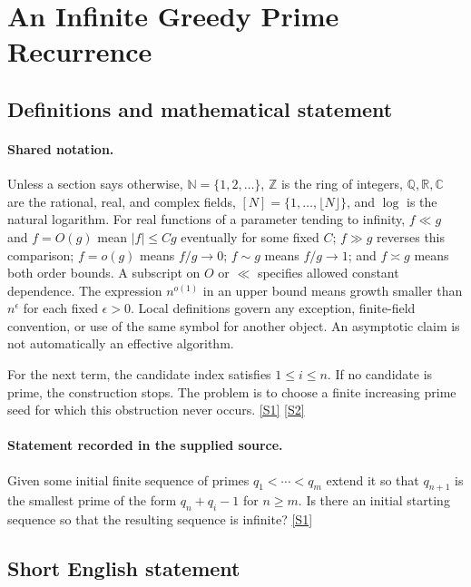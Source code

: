 \documentclass[11pt,a4paper]{article}
\newcommand{\N}{\mathbb{N}}
\newcommand{\Z}{\mathbb{Z}}
\newcommand{\Q}{\mathbb{Q}}
\newcommand{\R}{\mathbb{R}}
\newcommand{\C}{\mathbb{C}}
\newcommand{\sref}[2]{\hyperlink{source:#1:#2}{[S#2]}}
\begin{document}
\section{An Infinite Greedy Prime Recurrence}\label{statement}


\subsection{Definitions and mathematical statement}

\paragraph{Shared notation.}Unless a section says otherwise, $\N=\{1,2,\ldots\}$,
$\Z$ is the ring of integers, $\Q,\R,\C$ are the rational, real, and complex
fields, $[N]=\{1,\ldots,\lfloor N\rfloor\}$, and $\log$ is the natural
logarithm. For real functions of a parameter tending to infinity,
$f\ll g$ and $f=O(g)$ mean $|f|\leq Cg$ eventually for some fixed $C$;
$f\gg g$ reverses this comparison; $f=o(g)$ means $f/g\to0$;
$f\sim g$ means $f/g\to1$; and $f\asymp g$ means both order bounds.
A subscript on $O$ or $\ll$ specifies allowed constant dependence.
The expression $n^{o(1)}$ in an upper bound means growth smaller than
$n^\epsilon$ for each fixed $\epsilon>0$. Local definitions govern any
exception, finite-field convention, or use of the same symbol for another
object. An asymptotic claim is not automatically an effective algorithm.



For the next term, the candidate index satisfies $1\leq i\leq n$. If no candidate is prime, the construction stops. The problem is to choose a finite increasing prime seed for which this obstruction never occurs. \sref{statement}{1} \sref{statement}{2}

\paragraph{Statement recorded in the supplied source.}
Given some initial finite sequence of primes $q_1<\cdots<q_m$ extend it so that $q_{n+1}$ is the smallest prime of the form $q_n+q_i-1$ for $n\geq m$. Is there an initial starting sequence so that the resulting sequence is infinite? \sref{statement}{1}

\subsection{Short English statement}
\end{document}
